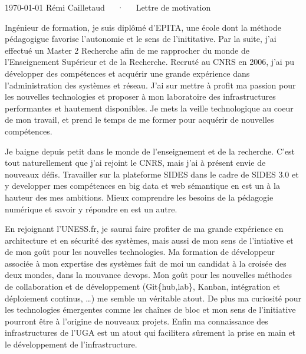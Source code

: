 \documentclass[11pt, a4paper]{awesome-cv}
\begin{document}
\makecvheader[R]

\makecvfooter
  {\today}
  {Rémi Cailletaud~~~·~~~Lettre de motivation}
  {}

\makelettertitle

\begin{cvletter}

	Ingénieur de formation, je suis diplômé d'EPITA, une école dont la méthode pédagogigue favorise l'autonomie et le sens de l'inititative. Par la suite, j'ai effectué un Master 2 Recherche afin de me rapprocher du monde de l'Enseignement Supérieur et de la Recherche. Recruté au CNRS en 2006, j'ai pu développer des compétences et acquérir une grande expérience dans l'administration des systèmes et réseau. J'ai sur mettre à profit ma passion pour les nouvelles technologies et proposer à mon laboratoire des infrastructures performantes et hautement disponibles. Je mets la veille technologique au coeur de mon travail, et prend le temps de me former pour acquérir de nouvelles compétences. 


	Je baigne depuis petit dans le monde de l'enseignement et de la recherche. C'est tout naturellement que j'ai rejoint le CNRS, mais j'ai à présent envie de nouveaux défis. Travailler sur la plateforme SIDES dans le cadre de SIDES 3.0 et y developper mes compétences en big data et web sémantique en est un à la hauteur des mes ambitions. Mieux comprendre les besoins de la pédagogie numérique et savoir y répondre en est un autre.	

	En rejoignant l'UNESS.fr, je saurai faire profiter de ma grande expérience en architecture et en sécurité des systèmes, mais aussi de mon sens de l'intiative et de mon goût pour les nouvelles technologies. Ma formation de développeur associée à mon expertise des systèmes fait de moi un candidat à la croisée des deux mondes, dans la mouvance devops. Mon goût pour les nouvelles méthodes de collaboration et de développement (Git\{hub,lab\}, Kanban, intégration et déploiement continus, \ldots) me semble un véritable atout. De plus ma curiosité pour les technologies émergentes comme les chaînes de bloc et mon sens de l'initiative pourront être à l'origine de nouveaux projets.
	Enfin ma connaissance des infrastructures de l'UGA est un atout qui facilitera sûrement la prise en main et le développement de l'infrastructure.
\end{cvletter}


\makeletterclosing
\end{document}
